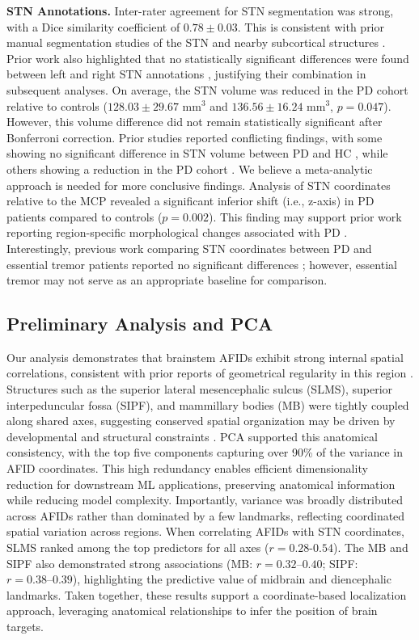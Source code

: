 \newpage
\textbf{STN Annotations.} Inter-rater agreement for STN segmentation was strong, with a Dice similarity coefficient of \( 0.78 \pm 0.03 \). This is consistent with prior manual segmentation studies of the STN and nearby subcortical structures \cite{Camlidag2014-za,Miller2023-ct}. Prior work also highlighted that no statistically significant differences were found between left and right STN annotations \cite{Duchin2018-sv, Miller2023-ct}, justifying their combination in subsequent analyses. On average, the STN volume was reduced in the PD cohort relative to controls (\( 128.03 \pm 29.67 \text{ mm}^3 \) and \( 136.56 \pm 16.24 \text{ mm}^3 \), \( p = 0.047 \)). However, this volume difference did not remain statistically significant after Bonferroni correction. Prior studies reported conflicting findings, with some showing no significant difference in STN volume between PD and HC \cite{Alkemade2017-tt, Camlidag2014-za}, while others showing a reduction in the PD cohort \cite{Colpan2010-up, Patriat2020-cm}. We believe a meta-analytic approach is needed for more conclusive findings. Analysis of STN coordinates relative to the MCP revealed a significant inferior shift (i.e., z-axis) in PD patients compared to controls (\( p = 0.002 \)). This finding may support prior work reporting region-specific morphological changes associated with PD \cite{Kaya2019-wa}. Interestingly, previous work comparing STN coordinates between PD and essential tremor patients reported no significant differences \cite{Duchin2018-sv}; however, essential tremor may not serve as an appropriate baseline for comparison.

\subsection{Preliminary Analysis and PCA}
Our analysis demonstrates that brainstem AFIDs exhibit strong internal spatial correlations, consistent with prior reports of geometrical regularity in this region \cite{Perera2024-lq}. Structures such as the superior lateral mesencephalic sulcus (SLMS), superior interpeduncular fossa (SIPF), and mammillary bodies (MB) were tightly coupled along shared axes, suggesting conserved spatial organization may be driven by developmental and structural constraints \cite{Parraga2016-bl}. PCA supported this anatomical consistency, with the top five components capturing over 90\% of the variance in AFID coordinates. This high redundancy enables efficient dimensionality reduction for downstream ML applications, preserving anatomical information while reducing model complexity. Importantly, variance was broadly distributed across AFIDs rather than dominated by a few landmarks, reflecting coordinated spatial variation across regions. When correlating AFIDs with STN coordinates, SLMS ranked among the top predictors for all axes (\( r = 0.28\text{-}0.54 \)). The MB and SIPF also demonstrated strong associations (MB: \( r = 0.32\text{--}0.40 \); SIPF: \( r = 0.38\text{--}0.39 \)), highlighting the predictive value of midbrain and diencephalic landmarks. Taken together, these results support a coordinate-based localization approach, leveraging anatomical relationships to infer the position of brain targets.

